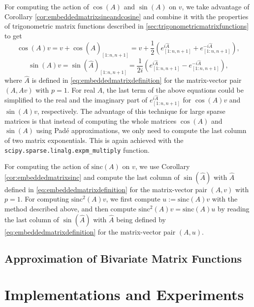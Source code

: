 For computing the action of $\cos(A)$ and $\sin(A)$ on $v$, we take advantage of Corollary
\ref{cor:embeddedmatrixsineandcosine} and combine it with the properties of trigonometric
matrix functions described in \autoref{sec:trigonometricmatrixfunctions} to get
\begin{equation*}
        \cos(A) v = v + \cos(\hat{A})_{[1 : n, n+1]}
        = v + \frac{1}{2} (e^{i\hat{A}}_{[1 : n, n+1]} + e^{-i\hat{A}}_{[1 : n, n+1]}),
\end{equation*}
\begin{equation*}
        \sin(A) v = \sin(\hat{A})_{[1 : n, n+1]}
        = \frac{1}{2i} (e^{i\hat{A}}_{[1 : n, n+1]} - e^{-i\hat{A}}_{[1 : n, n+1]}),
\end{equation*}
where $\hat{A}$ is defined in \eqref{eq:embeddedmatrixdefinition} for the matrix-vector
pair $(A, Av)$ with $p=1$.
For real $A$, the last term of the above equations could be simplified to the real and
the imaginary part of $e^{i\hat{A}}_{[1 : n, n+1]}$ for $\cos(A)v$ and $\sin(A)v$,
respectively.
The advantage of this technique for large sparse matrices is that instead of computing
the whole matrices $\cos(A)$ and $\sin(A)$ using Padé approximations, we only need to
compute the last column of two matrix exponentials. This is again achieved with the
\texttt{scipy.sparse.linalg.expm\_multiply} function.

For computing the action of $\mathrm{sinc}(A)$ on $v$, we use Corollary
\ref{cor:embeddedmatrixsinc} and compute the last column of $\sin(\hat{A})$ with
$\hat{A}$ defined in \eqref{eq:embeddedmatrixdefinition} for the matrix-vector
pair $(A, v)$ with $p=1$. For computing $\mathrm{sinc}^2(A) v$, we
first compute $u := \mathrm{sinc}(A)v$ with the method described above, and then
compute $\mathrm{sinc}^2(A) v = \mathrm{sinc}(A) u$ by reading the last column
of $\sin(\hat{A})$ with $\hat{A}$ being defined by
\eqref{eq:embeddedmatrixdefinition} for the matrix-vector pair $(A, u)$.

\subsection{Approximation of Bivariate Matrix Functions}
\label{sec:krylovmethodbivariate}


\section{Implementations and Experiments}

